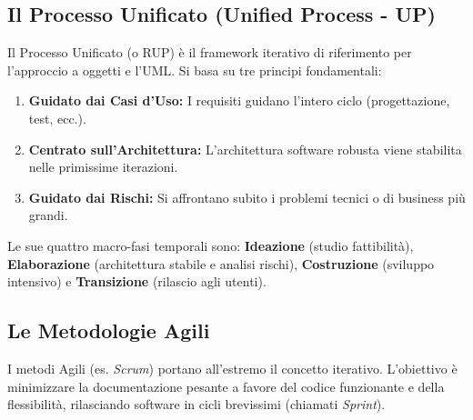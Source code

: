 \documentclass[10pt, a4paper]{article}
\begin{document}
\subsection{Il Processo Unificato (Unified Process - UP)}
Il Processo Unificato (o RUP) è il framework iterativo di riferimento per l'approccio a oggetti e l'UML. Si basa su tre principi fondamentali:
\begin{enumerate}
    \item \textbf{Guidato dai Casi d'Uso:} I requisiti guidano l'intero ciclo (progettazione, test, ecc.).
    \item \textbf{Centrato sull'Architettura:} L'architettura software robusta viene stabilita nelle primissime iterazioni.
    \item \textbf{Guidato dai Rischi:} Si affrontano subito i problemi tecnici o di business più grandi.
\end{enumerate}

Le sue quattro macro-fasi temporali sono: \textbf{Ideazione} (studio fattibilità), \textbf{Elaborazione} (architettura stabile e analisi rischi), \textbf{Costruzione} (sviluppo intensivo) e \textbf{Transizione} (rilascio agli utenti).

\subsection{Le Metodologie Agili}
I metodi Agili (es. \textit{Scrum}) portano all'estremo il concetto iterativo. L'obiettivo è minimizzare la documentazione pesante a favore del codice funzionante e della flessibilità, rilasciando software in cicli brevissimi (chiamati \textit{Sprint}).
\end{document}
